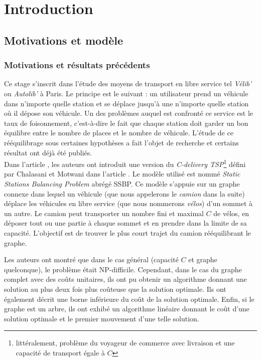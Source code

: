 \chapter{Introduction}

\section{Motivations et modèle}

\subsection{Motivations et résultats précédents}
Ce stage s'inscrit dans l'étude des moyens de transport en libre service tel \emph{Vélib'} ou \emph{Autolib'} à Paris. Le principe est le suivant : un utilisateur prend un véhicule dans n'importe quelle station et se déplace jusqu'à une n'importe quelle station où il dépose son véhicule. Un des problèmes auquel est confronté ce service est le taux de foisonnement, c'est-à-dire le fait que chaque station doit garder un bon équilibre entre le nombre de places et le nombre de véhicule. L'étude de ce rééquilibrage sous certaines hypothèses a fait l'objet de recherche et certains résultat ont déjà été publiés.
\\

Dans l'article \cite{Benchimol2011}, les auteurs ont introduit une version du \emph{C-delivery TSP}\footnote{littéralement, problème du voyageur de commerce avec livraison et une capacité de transport égale à $C$} défini par Chalasani et Motwani dans l'article \cite{Chalasani1999}. Le modèle utilisé est nommé \emph{Static Stations Balancing Problem} abrégé SSBP. Ce modèle s'appuie sur un graphe connexe dans lequel un véhicule (que nous appelerons le \emph{camion} dans la suite) déplace les véhicules en libre service (que nous nommerons \emph{vélos}) d'un sommet à un autre. Le camion peut transporter un nombre fini et maximal $C$ de vélos, en déposer tout ou une partie à chaque sommet et en prendre dans la limite de sa capacité. L'objectif est de trouver le plus court trajet du camion rééquilibrant le graphe.

Les auteurs ont montré que dans le cas général (capacité $C$ et graphe quelconque), le problème était NP-difficile. Cependant, dans le cas du graphe complet avec des coûts unitaires, ils ont pu obtenir un algorithme donnant une solution au plus deux fois plus coûteuse que la solution optimale. Ils ont également décrit une borne inférieure du coût de la solution optimale. Enfin, si le graphe est un arbre, ils ont exhibé un algorithme linéaire donnant le coût d'une solution optimale et le premier mouvement d'une telle solution.
\\

